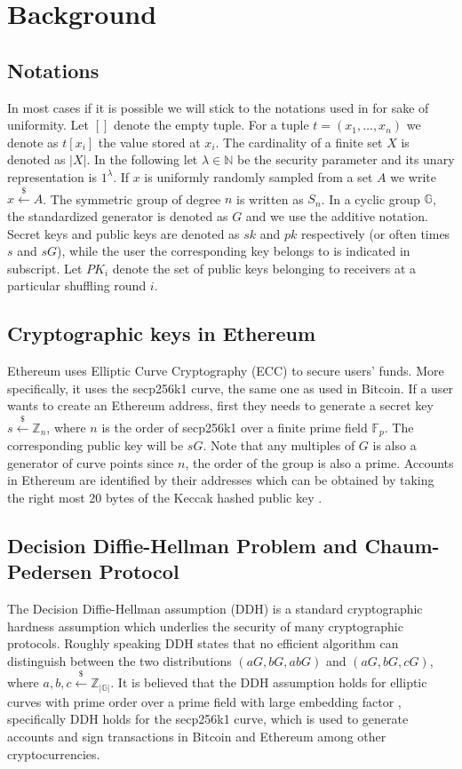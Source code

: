 \documentclass[a4paper]{article}
\theoremstyle{definition}
\begin{document}
\section{Background}
\subsection{Notations}
In most cases if it is possible we will stick to the notations used in \cite{meiklejohn2018mobius} for sake of uniformity. 
Let $[]$ denote the empty tuple. For a tuple $t=(x_1,\dots,x_n)$ we denote as $t[x_i]$ the value stored at $x_{i}$. The cardinality of a finite set $X$ is denoted as $|X|$. In the following let $\lambda \in \mathbb{N}$ be the security parameter and its unary representation is $1^{\lambda}$. If $x$ is uniformly randomly sampled from a set $A$ we write $x\stackrel{\$}{\leftarrow}A$. The symmetric group of degree $n$ is written as ${S}_n$. In a cyclic group $\mathbb{G}$, the standardized generator is denoted as $G$ and we use the additive notation. Secret keys and public keys are denoted as $sk$ and $pk$ respectively (or often times $s$ and $sG$), while the user the corresponding key belongs to is indicated in subscript. Let $PK_{i}$ denote the set of public keys belonging to receivers at a particular shuffling round $i$.

\subsection{Cryptographic keys in Ethereum}
Ethereum uses Elliptic Curve Cryptography (ECC) to secure users' funds. More specifically, it uses the secp256k1 curve, the same one as used in Bitcoin. If a user wants to create an Ethereum address, first they needs to generate a secret key  $s\stackrel{\$}{\leftarrow}\mathbb{Z}_n$, where $n$ is the order of secp256k1 over a finite prime field $\mathbb{F}_{p}$. The corresponding public key will be $sG$. Note that any multiples of $G$ is also a generator of curve points since $n$, the order of the group is also a prime. Accounts in Ethereum are identified by their addresses which can be obtained by taking the right most 20 bytes of the Keccak hashed public key \cite{wood2014ethereum}. 
    
\subsection{Decision Diffie-Hellman Problem and Chaum-Pedersen Protocol}

The Decision Diffie-Hellman assumption (DDH) is a standard cryptographic hardness assumption which underlies the security of many cryptographic protocols. Roughly speaking DDH states that no efficient algorithm can distinguish between the two distributions $(aG, bG, abG)$ and $(aG, bG, cG)$, where $a,b,c\stackrel{\$}{\leftarrow}\mathbb{Z}_{|\mathbb{G}|}$. It is believed that the DDH assumption holds for elliptic curves with prime order over a prime field with large embedding factor \cite{boneh1998decision}, specifically DDH holds for the secp256k1 curve, which is used to generate accounts and sign transactions in Bitcoin and Ethereum among other cryptocurrencies. 
\end{document}
